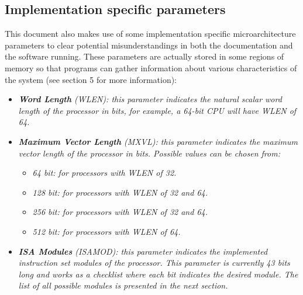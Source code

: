     \subsection[Implementation specific parameters]{Implementation specific parameters}

        \vspace{10pt}

        This document also makes use of some implementation specific microarchitecture parameters to clear potential misunderstandings in both the documentation and the software running. These parameters are actually stored in some regions of memory so that programs can gather information about various characteristics of the system (see section 5 for more information):

        \begin{itemize}

            \item \textit{\textbf{Word Length} (WLEN): this parameter indicates the natural scalar word length of the processor in bits, for example, a 64-bit CPU will have WLEN of 64.}

            \item \textit{\textbf{Maximum Vector Length} (MXVL): this parameter indicates the maximum vector length of the processor in bits. Possible values can be chosen from:}

                \begin{itemize}

                    \item \textit{64 bit: for processors with WLEN of 32.}
                    \item \textit{128 bit: for processors with WLEN of 32 and 64.}
                    \item \textit{256 bit: for processors with WLEN of 32 and 64.}
                    \item \textit{512 bit: for processors with WLEN of 64.}

                \end{itemize}

            \item \textit{\textbf{ISA Modules} (ISAMOD): this parameter indicates the implemented instruction set modules of the processor. This parameter is currently 43 bits long and works as a checklist where each bit indicates the desired module. The list of all possible modules is presented in the next section.}

        \end{itemize}


